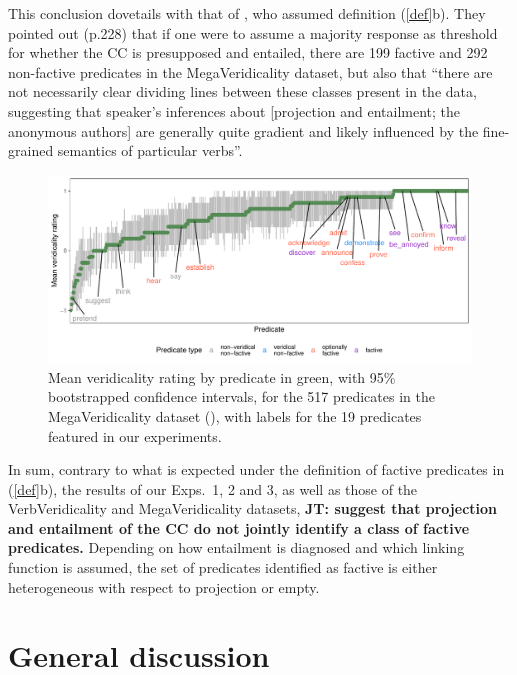 \documentclass[11pt,fleqn]{article}
\newcommand{\6}{\mbox{$[\hspace*{-.6mm}[$}}
\newcommand{\9}{\mbox{$]\hspace*{-.6mm}]$}}
\newcommand{\jt}[1]{\textbf{\color{blue}JT: #1}}
\begin{document}
 This conclusion dovetails with that of \citet{white-rawlins-nels2018}, who assumed definition (\ref{def}b). They pointed out (p.228) that if one were to assume a majority response as threshold for whether the CC is presupposed and entailed, there are 199 factive and 292 non-factive predicates in the MegaVeridicality dataset, but also that ``there are not necessarily clear dividing lines between these classes present in the data, suggesting that speaker's inferences about [projection and entailment; the anonymous authors] are generally quite gradient and likely influenced by the fine-grained semantics
of particular verbs''.

\begin{figure}[H]
\centering
\includegraphics[width=.75\paperwidth]{../../MegaVeridicality-analysis/graphs/means-entailment-by-predicate}

\caption{Mean veridicality rating by predicate in green, with 95\% bootstrapped confidence intervals, for the 517 predicates in the MegaVeridicality dataset (\citealt{white-rawlins-nels2018,white-etal2018b}), with labels for the 19 predicates featured in our experiments.}
\label{f-white-rawlins-ent}
\end{figure}

In sum, contrary to what is expected under the definition of factive predicates in (\ref{def}b), the results of our Exps.~1, 2 and 3, as well as those of the VerbVeridicality and MegaVeridicality datasets, \jt{suggest that projection and entailment of the CC do not jointly identify a class of factive predicates.} Depending on how entailment is diagnosed and which linking function is assumed, the set of predicates identified as factive is either heterogeneous with respect to projection or empty. 

\section{General discussion}\label{s4}
\end{document}
